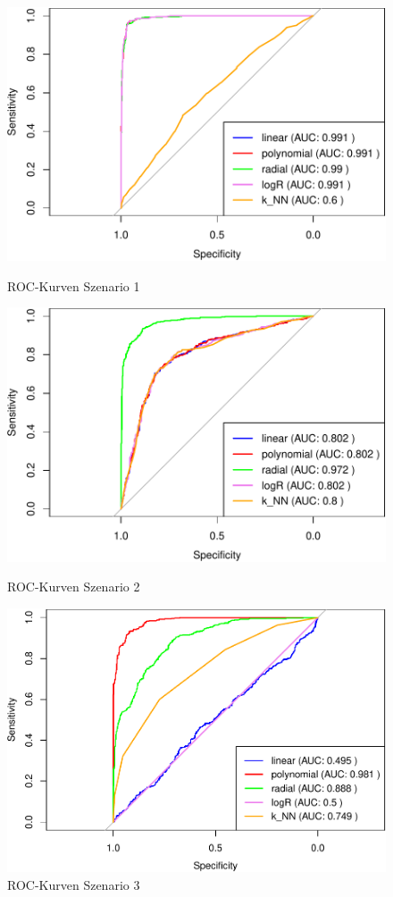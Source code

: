 \documentclass[
]{article}
\begin{document}
\begin{figure}[htb]
\begin{minipage}{0.48\linewidth}
\centering
\includegraphics{Ergebnisse_files/figure-latex/S1ROC-1.pdf}
\caption{ROC-Kurven Szenario 1}
\label{fig:S1ROC}
\end{minipage}
\hfill
\begin{minipage}{0.48\linewidth}
\centering
\includegraphics{Ergebnisse_files/figure-latex/S2ROC-1.pdf}
\caption{ROC-Kurven Szenario 2}
\label{fig:S2ROC}
\end{minipage}
\vspace*{0.5cm}\newline
\begin{minipage}{\linewidth}
\centering
\includegraphics[width=0.48\linewidth]{Ergebnisse_files/figure-latex/S3ROC-1.pdf}
\caption{ROC-Kurven Szenario 3}
\label{fig:S3ROC}
\end{minipage}
\end{figure}
\end{document}

